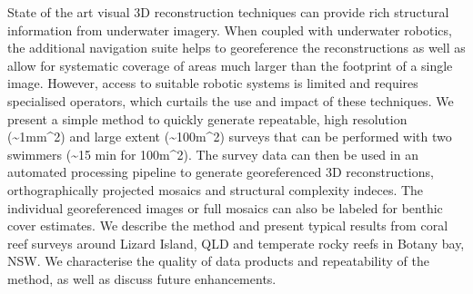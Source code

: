 
State of the art visual 3D reconstruction techniques can provide rich structural information from underwater imagery. When coupled with underwater robotics, the additional navigation suite helps to georeference the reconstructions as well as allow for systematic coverage of areas much larger than the footprint of a single image. However, access to suitable robotic systems is limited and requires specialised operators, which curtails the use and impact of these techniques.
We present a simple method to quickly generate repeatable, high resolution (\sim{1mm^{2}}) and large extent (\sim{100m^{2}}) surveys that can be performed with two swimmers (\sim{15 min} for {100m^{2}}). The survey data can then be used in an automated processing pipeline to generate georeferenced 3D reconstructions, orthographically projected mosaics and structural complexity indeces. The individual georeferenced images or full mosaics can also be labeled for benthic cover estimates.
We describe the method and present typical results from coral reef surveys around Lizard Island, QLD and temperate rocky reefs in Botany bay, NSW. We characterise the quality of data products and repeatability of the method, as well as discuss future enhancements.
  
  